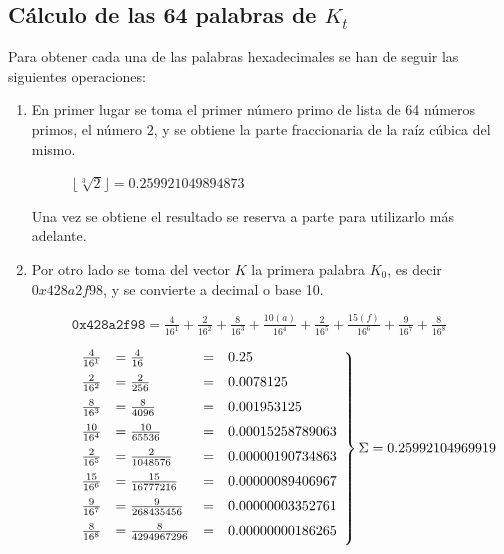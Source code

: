 \documentclass{article}
\begin{document}
    \subsection{Cálculo de las 64 palabras de $K_{t}$}
        Para obtener cada una de las palabras hexadecimales se han de seguir las siguientes operaciones:
        \begin{enumerate}
            \item En primer lugar se toma el primer número primo de lista de 64 números primos, el número $2$, y se obtiene la parte fraccionaria de la raíz cúbica del mismo.
                \begin{figure}[H]
                \centering
                    $\lfloor \sqrt[3]{2} \rfloor = 0.259921049894873$
                \end{figure}
                Una vez se obtiene el resultado se reserva a parte para utilizarlo más adelante.
            
            \item Por otro lado se toma del vector $K$ la primera palabra $K_{0}$, es decir $0x428a2f98$, y se convierte a decimal o base 10.
                \begin{figure}[H]
                \centering
                    $\texttt{0x428a2f98} = \frac{4}{16^{1}} + \frac{2}{16^{2}} + \frac{8}{16^{3}} + \frac{10(a)}{16^{4}} + \frac{2}{16^{5}} + \frac{15(f)}{16^{6}} + \frac{9}{16^{7}} + \frac{8}{16^{8}}$
                \end{figure}
                \begin{figure}[H]
                \centering
                    $\left .
                    \begin{array}{llllr}
                    \vspace{2mm}
                    \frac{4}{16^{1}} & = \frac{4}{16} & = & 0.25 \\ \vspace{2mm}
                    \frac{2}{16^{2}} & = \frac{2}{256} & = & 0.0078125 \\ \vspace{2mm}
                    \frac{8}{16^{3}} & = \frac{8}{4096} & = & 0.001953125 \\ \vspace{2mm}
                    \frac{10}{16^{4}} & = \frac{10}{65536} & = & 0.00015258789063 \\ \vspace{2mm}
                    \frac{2}{16^{5}} & = \frac{2}{1048576} & = & 0.00000190734863 \\ \vspace{2mm}
                    \frac{15}{16^{6}} & = \frac{15}{16777216} & = & 0.00000089406967 \\ \vspace{2mm}
                    \frac{9}{16^{7}} & = \frac{9}{268435456} & = & 0.00000003352761 \\ \vspace{2mm}
                    \frac{8}{16^{8}} & = \frac{8}{4294967296} & = & 0.00000000186265
                    \end{array}
                    \right \} \Sigma = 0.25992104969919$
                \end{figure}
            

\end{enumerate}
\end{document}

